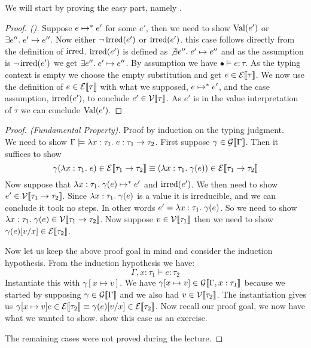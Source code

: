 We will start by proving the easy part, namely .
\begin{proof}[Proof. ()]
Suppose $e \mapsto^{*} e'$ for some $e'$, then we need to show $\operatorname{Val}(e')$ or $\exists e''. \; e' \mapsto e''$. Now either $\neg \operatorname{irred}(e')$ or $\operatorname{irred}(e')$.
 this case follows directly from the definition of $\operatorname{irred}$. $\operatorname{irred}(e')$ is defined as $\not \exists e''. \; e' \mapsto e''$ and as the assumption is $\neg \operatorname{irred}(e')$ we get $\exists e''. \; e' \mapsto e''$.
 By assumption we have $\bullet \models e : \tau$. As the typing context is empty we choose the empty substitution and get $e \in \mathcal{E}\llbracket \tau \rrbracket$. We now use the definition of $e \in \mathcal{E}\llbracket \tau \rrbracket$ with what we supposed, $e \mapsto^{*} e'$, and the case assumption, $\operatorname{irred}(e')$, to conclude $e' \in \mathcal{V}\llbracket \tau \rrbracket$. As $e'$ is in the value interpretation of $\tau$ we can conclude $\operatorname{Val}(e')$. 
\end{proof}
\begin{proof}[Proof. (Fundamental Property)] Proof by induction on the typing judgment.
  \case{\TAbs} \\
We need to show $\Gamma \models \lambda x : \tau_1 . \; e :  \tau_1 \rightarrow \tau_2$. First suppose $\gamma \in \mathcal{G}\llbracket \Gamma \rrbracket$. Then it suffices to show
\[
  \gamma(\lambda x : \tau_1 . \; e) \in \mathcal{E}\llbracket  \tau_1 \rightarrow \tau_2 \rrbracket \equiv
  (\lambda x : \tau_1 . \; \gamma(e)) \in \mathcal{E}\llbracket  \tau_1 \rightarrow \tau_2 \rrbracket
\]
Now suppose that $\lambda x : \tau_1 . \; \gamma(e) \mapsto^{*} e'$ and $\operatorname{irred}(e')$. We then need to show $e' \in \mathcal{V}\llbracket  \tau_1 \rightarrow \tau_2 \rrbracket$. Since $\lambda x : \tau_1 . \; \gamma(e)$ is a value it is irreducible, and we can conclude it took no steps. In other words $e' = \lambda x : \tau_1 . \; \gamma(e)$. So we need to show $\lambda x : \tau_1 . \; \gamma(e) \in \mathcal{V}\llbracket  \tau_1 \rightarrow \tau_2 \rrbracket$. Now suppose $v \in \mathcal{V}\llbracket \tau_1 \rrbracket$ then we need to show $\gamma(e)[v/x] \in \mathcal{E}\llbracket \tau_2 \rrbracket$.

Now let us keep the above proof goal in mind and consider the induction hypothesis. From the induction hypothesis we have:
\[
  \Gamma, x: \tau_1 \models e : \tau_2
\]
Instantiate this with $\gamma[x \mapsto v]$. We have $\gamma[x \mapsto v] \in \mathcal{G}\llbracket \Gamma, x : \tau_1 \rrbracket$ because we started by supposing $\gamma \in \mathcal{G}\llbracket \Gamma \rrbracket$ and we also had $v \in \mathcal{V}\llbracket \tau_2 \rrbracket$. The instantiation gives us $\gamma[x \mapsto v] e \in  \mathcal{E}\llbracket \tau_2 \rrbracket \equiv \gamma(e)[v/x] \in \mathcal{E}\llbracket \tau_2 \rrbracket$. Now recall our proof goal, we now have what we wanted to show.
\case{\TApp} show this case as an exercise.

The remaining cases were not proved during the lecture.
\end{proof}
